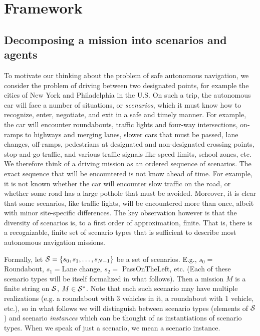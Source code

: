 \section{Framework}
\label{framework}

\subsection{Decomposing a mission into scenarios and agents}
To motivate our thinking about the problem of safe autonomous navigation, we consider the problem of driving between two designated points, for example the cities of New York and Philadelphia in the U.S.
On such a trip, the autonomous car will face a number of situations, or \emph{scenarios}, which it must know how to recognize, enter, negotiate, and exit in a safe and timely manner.
For example, the car will encounter roundabouts, 
traffic lights and four-way intersections, 
on-ramps to highways and merging lanes, 
slower cars that must be passed, 
lane changes, 
off-ramps, 
pedestrians at designated and non-designated crossing points, 
stop-and-go traffic, 
and various traffic signals like speed limits, school zones, etc.
We therefore think of a driving mission as an ordered sequence of scenarios.
The exact sequence that will be encountered is not know ahead of time. 
For example, it is not known whether the car will encounter slow traffic on the road, or whether some road has a large pothole that must be avoided.
Moreover, it is clear that some scenarios, like traffic lights, will be encountered more than once, albeit with minor site-specific differences. 
The key observation however is that the diversity of scenarios is, to a first order of approximation, finite. 
That is, there is a recognizable, finite set of scenario types that is sufficient to describe most autonomous navigation missions.

Formally, let $\mathcal{S} = \{s_0,s_1,\ldots,s_{N-1}\}$ be a set of scenarios. 
E.g., $s_0 = $ Roundabout, $s_1 = $Lane change, $s_2 = $ PassOnTheLeft, etc. 
(Each of these scenario types will be itself formalized in what follows).
Then a mission $M$ is a finite string on $\mathcal{S}$, $M \in \mathcal{S}^*$.
Note that each such scenario may have multiple realizations (e.g. a roundabout with 3 vehicles in it, a roundabout with 1 vehicle, etc.), so in what follows we will distinguish between scenario types (elements of $\mathcal{S}$) and scenario \emph{instances} which can be thought of as instantiations of scenario types.
When we speak of just a scenario, we mean a scenario instance.

